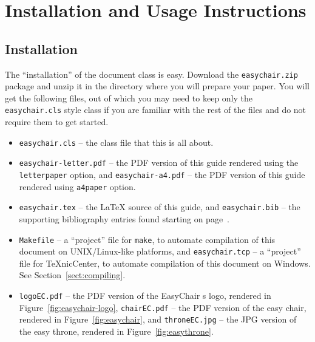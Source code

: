 \documentclass{easychair}
\newcommand{\easychair}{\sf{easychair}}
\newcommand{\texniccenter}{{\TeX}nicCenter}
\newcommand{\makefile}{\texttt{Makefile}}
\begin{document}
\section{Installation and Usage Instructions}
\label{sect:installation-usage}

\subsection{Installation}

The ``installation'' of the {\easychair} document class is easy.
Download the \texttt{easychair.zip} package 
and unzip it in the directory where you will prepare your paper.
You will get the following files, out of which you may need to keep only 
the \texttt{easychair.cls} style class if you are familiar with the rest 
of the files and do not require them to get started.

\begin{itemize}
\item
\texttt{easychair.cls} -- the class file that this is all about.

\item
\texttt{easychair-letter.pdf} -- the PDF version of this guide rendered using 
the \texttt{letterpaper} option, 
and 
\texttt{easychair-a4.pdf} -- the PDF version of this guide rendered using 
\texttt{a4paper} option.

\item
\texttt{easychair.tex} -- the {\LaTeX} source of this guide, 
and
\texttt{easychair.bib} -- the supporting bibliography entries found starting 
on page~\pageref{sect:bib}.

\item
{\makefile} -- a ``project'' file for \texttt{make}, to automate compilation of 
this document on UNIX/Linux-like platforms,
and
\texttt{easychair.tcp} -- a ``project'' file for {\texniccenter}, to automate
compilation of this document on Windows. 
See Section~\ref{sect:compiling}.

\item
\texttt{logoEC.pdf} -- the PDF version of the EasyChair s logo, rendered in
Figure~\ref{fig:easychair-logo},
\texttt{chairEC.pdf} -- the PDF version of the easy chair, rendered in 
Figure~\ref{fig:easychair},
and
\texttt{throneEC.jpg} -- the JPG version of the easy throne, rendered in 
Figure~\ref{fig:easythrone}.

\end{itemize}
\end{document}
